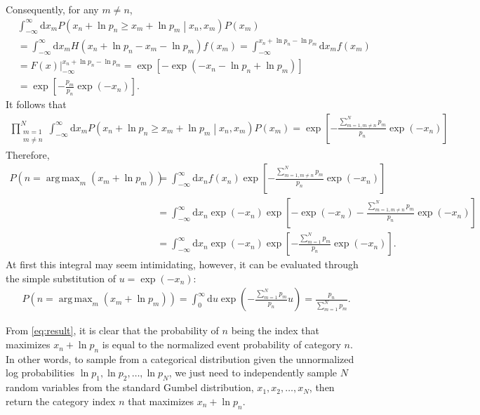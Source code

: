 \documentclass{book}[12pt]
\DeclareMathOperator*{\argmax}{arg\,max}
\begin{document}
Consequently, for any $m\neq n$,
\begin{align}
     & \int_{-\infty}^\infty\mathrm{d}x_m P\left(x_n+\ln p_n\geq x_m+\ln p_m\middle|x_n,x_m\right) P\left(x_m\right)\nonumber \\
     & =\int_{-\infty}^\infty\mathrm{d}x_m H(x_n+\ln p_n-x_m-\ln p_m) f\left(x_m\right)
    =\int_{-\infty}^{x_n+\ln p_n-\ln p_m}\mathrm{d}x_m f\left(x_m\right)\nonumber                                             \\
     & =F\left(x\right)\Big|_{-\infty}^{x_n+\ln p_n-\ln p_m}=\exp\left[-\exp\left(-x_n-\ln p_n+\ln p_m\right)\right]\nonumber \\
     & =\exp\left[-\frac{p_m}{p_n}\exp\left(-x_n\right)\right].
\end{align}
It follows that
\begin{align}
    \prod_{\substack{m=1 \\m\neq n}}^N\int_{-\infty}^\infty\mathrm{d}x_m P\left(x_n+\ln p_n\geq x_m+\ln p_m\middle|x_n,x_m\right) P\left(x_m\right)
    =\exp\left[-\frac{\sum_{m=1,m\neq n}^N p_m}{p_n}\exp\left(-x_n\right)\right]
\end{align}
Therefore,
\begin{align}
    P\left(n=\argmax_m\left(x_m+\ln p_m\right)\right)
     & =\int_{-\infty}^\infty\mathrm{d}x_n f\left(x_n\right) \exp\left[-\frac{\sum_{m=1,m\neq n}^N p_m}{p_n}\exp\left(-x_n\right)\right]\nonumber                           \\
     & =\int_{-\infty}^\infty\mathrm{d}x_n \exp\left(-x_n\right) \exp\left[-\exp\left(-x_n\right)-\frac{\sum_{m=1,m\neq n}^N p_m}{p_n}\exp\left(-x_n\right)\right]\nonumber \\
     & =\int_{-\infty}^\infty\mathrm{d}x_n \exp\left(-x_n\right) \exp\left[-\frac{\sum_{m=1}^N p_m}{p_n}\exp\left(-x_n\right)\right].
\end{align}
At first this integral may seem intimidating, however, it can be evaluated through the simple substitution of $u=\exp\left(-x_n\right)$:
\begin{align}
     & P\left(n=\argmax_m\left(x_m+\ln p_m\right)\right)=\int_0^\infty\mathrm{d}u \exp\left(-\frac{\sum_{m=1}^N p_m}{p_n}u\right)=\frac{p_n}{\sum_{m=1}^N p_m}.\label{eq:result}
\end{align}

From \cref{eq:result}, it is clear that the probability of $n$ being the index that maximizes $x_n+\ln p_n$ is equal to the normalized event probability of category $n$. In other words, to sample from a categorical distribution given the unnormalized log probabilities $\ln p_1,\ln p_2,\dots,\ln p_N$, we just need to independently sample $N$ random variables from the standard Gumbel distribution, $x_1,x_2,\dots,x_N$, then return the category index $n$ that maximizes $x_n+\ln p_n$.
\end{document}
